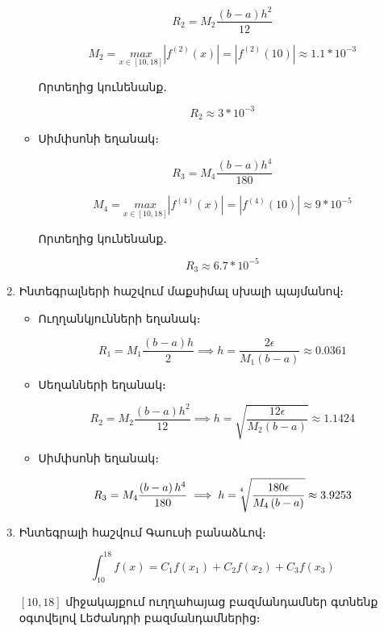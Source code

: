 \documentclass{article}
\begin{document}
\begin{enumerate}
\begin{itemize}
		$$R_2 = M_{2} \dfrac{\left(b - a\right)h^{2}}{12}$$

		$$M_{2} = \underset{x \in \left[10, 18\right]}{max}\left|f^{\left(2\right)}\left(x\right)\right| = \left|f^{\left(2\right)}\left(10\right)\right| \approx 1.1 * 10^{-3}$$

		Որտեղից կունենանք․

		$$R_2 \approx 3 * 10^{-3}$$

\item Սիմփսոնի եղանակ։
		
		$$R_3 = M_{4} \dfrac{\left(b - a\right)h^{4}}{180}$$

		$$M_{4} = \underset{x \in \left[10, 18\right]}{max}\left|f^{\left(4\right)}\left(x\right)\right| = \left|f^{\left(4\right)}\left(10\right)\right| \approx 9 * 10^{-5}$$

		Որտեղից կունենանք․

		$$R_3 \approx 6.7 * 10^{-5}$$



\end{itemize}

\item Ինտեգրալների հաշվում մաքսիմալ սխալի պայմանով։

\begin{itemize}


\item Ուղղանկյունների եղանակ։

		$$R_1 = M_{1} \dfrac{\left(b - a\right)h}{2} \implies h = \dfrac{2 \epsilon}{M_1 \left(b - a\right)} \approx 0.0361 $$


\item Սեղանների եղանակ։

		$$R_2 = M_{2} \dfrac{\left(b - a\right)h^{2}}{12} \implies h = \sqrt{\dfrac{12 \epsilon}{M_{2}\left(b - a\right)}} \approx 1.1424$$

\item Սիմփսոնի եղանակ։

		$$R_3 = M_{4} \dfrac{\left(b - a\right)h^{4}}{180} \implies h = \sqrt[\leftroot{5} \uproot{5}4]{\dfrac{180 \epsilon}{M_{4}\left(b - a\right)}} \approx 3.9253$$


\end{itemize}

\item Ինտեգրալի հաշվում Գաուսի բանաձևով։

$$\int_{10}^{18} f \left(x\right) = C_{1}f\left(x_{1}\right)+C_{2}f\left(x_{2}\right)+C_{3}f\left(x_{3}\right)$$

$\left[10, 18\right]$ միջակայքում ուղղահայաց բազմանդամներ գտնենք օգտվելով Լեժանդրի բազմանդամներից։


\end{enumerate}
\end{document}
